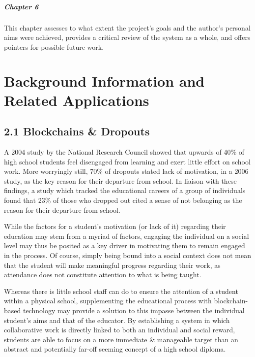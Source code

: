 \documentclass[12pt]{report}
\let\oldparagraph\paragraph
\renewcommand{\paragraph}[1]{\oldparagraph{#1}\mbox{}}
\begin{document}
\paragraph{Chapter 6}\label{chapter-6}

This chapter assesses to what extent the project's goals and the
author's personal aims were achieved, provides a critical review of the
system as a whole, and offers pointers for possible future work.

\clearpage

\chapter{Background Information and Related
Applications}

\section{2.1 Blockchains \& Dropouts}\label{blockchains-dropouts}

A 2004 study by the National Research Council showed that upwards of
40\% of high school students feel disengaged from learning and exert
little effort on school work\cite{Usher2013}. More worryingly still, 70\% of dropouts stated
lack of motivation, in a 2006 study, as the key reason for their
departure from school\cite{bridgeland2006silent}. In liaison with these
findings, a study which tracked the educational careers of a group of
individuals found that 23\% of those who dropped out cited a sense of
not belonging as the reason for their departure from school\cite{berktold1998subsequent}.

While the factors for a student's motivation (or lack of it) regarding
their education may stem from a myriad of factors, engaging the
individual on a social level may thus be posited as a key driver in
motivating them to remain engaged in the process\cite{johnson2001students}. Of course, simply being
bound into a social context does not mean that the student will make
meaningful progress regarding their work, as attendance does not
constitute attention to what is being taught.

Whereas there is little school staff can do to ensure the attention of a
student within a physical school, supplementing the educational process
with blockchain-based technology may provide a solution to this impasse
between the individual student's aims and that of the educator. By
establishing a system in which collaborative work is directly linked to
both an individual and social reward, students are able to focus on a
more immediate \& manageable target than an abstract and potentially
far-off seeming concept of a high school diploma.
\end{document}
